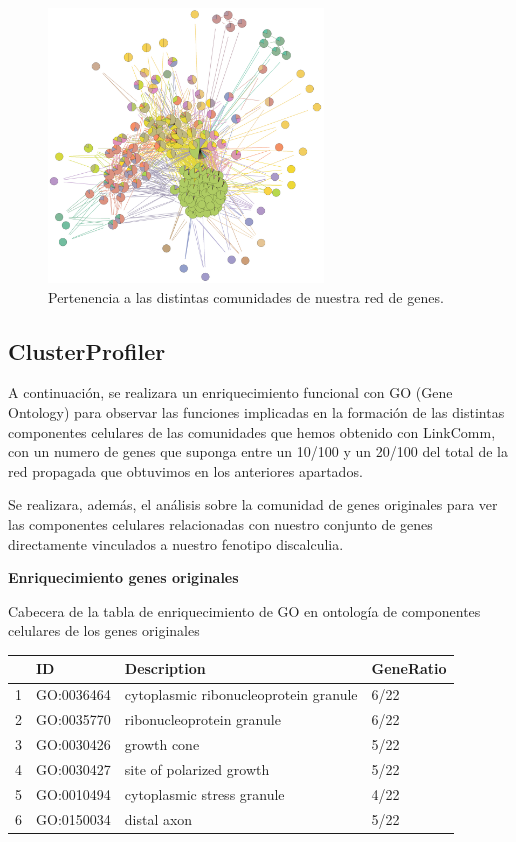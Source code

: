 \begin{figure}[h]
	\centering
	\includegraphics[width=0.65\textwidth]{figures/Grafo_Linkcomm.PNG}
	\caption{Pertenencia a las distintas comunidades de nuestra red de genes. }
	\label{fig:LinkComm3}
\end{figure}

\newpage

\subsection{ClusterProfiler}

\hfill

A continuación, se realizara un enriquecimiento funcional con GO (Gene Ontology) para observar las funciones implicadas en la formación de las distintas componentes celulares de las comunidades que hemos obtenido con LinkComm, con un numero de genes que suponga entre un 10/100 y un 20/100 del total de la red propagada que obtuvimos en los anteriores apartados.

Se realizara, además, el análisis sobre la comunidad de genes originales para ver las componentes celulares relacionadas con nuestro conjunto de genes directamente vinculados a nuestro fenotipo discalculia.

\hfill


\textbf{Enriquecimiento genes originales}

  Cabecera de la tabla de enriquecimiento de GO en ontología de componentes celulares de los genes originales 

\hfill


\begin{table}[ht]
\centering
\begin{tabular}{rlll}
  \hline
 & ID & Description & GeneRatio \\ 
  \hline
1 & GO:0036464 & cytoplasmic ribonucleoprotein granule & 6/22 \\ 
  2 & GO:0035770 & ribonucleoprotein granule & 6/22 \\ 
  3 & GO:0030426 & growth cone & 5/22 \\ 
  4 & GO:0030427 & site of polarized growth & 5/22 \\ 
  5 & GO:0010494 & cytoplasmic stress granule & 4/22 \\ 
  6 & GO:0150034 & distal axon & 5/22 \\ 
   \hline
\end{tabular}
\end{table}

